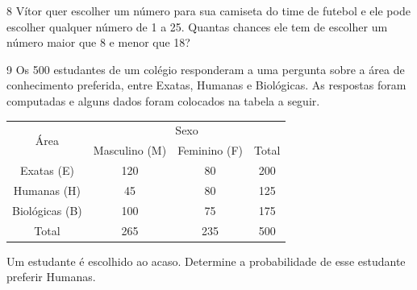 
\num{8} Vítor quer escolher um número para sua camiseta do time de futebol e ele
pode escolher qualquer número de 1 a 25. Quantas chances ele tem de
escolher um número maior que 8 e menor que 18?

\begin{mdframed}[linewidth=2pt,linecolor=salmao,roundcorner=2pt]


\end{mdframed}

\num{9} Os 500 estudantes de um colégio responderam a uma pergunta sobre a
área de conhecimento preferida, entre Exatas, Humanas e
Biológicas. As respostas foram computadas e alguns dados foram colocados
na tabela a seguir.

\begin{center}
\begin{tabular}{c|ccc}
\hline
\multirow{2}{*}{Área} & \multicolumn{3}{c}{Sexo} \\ \cline{2-4} 
 & \multicolumn{1}{c|}{Masculino (M)} & \multicolumn{1}{c|}{Feminino (F)} & Total \\ \hline
Exatas (E) & \multicolumn{1}{c|}{120} & \multicolumn{1}{c|}{80} & 200 \\ \hline
Humanas (H) & \multicolumn{1}{c|}{45} & \multicolumn{1}{c|}{80} & 125 \\ \hline
Biológicas (B) & \multicolumn{1}{c|}{100} & \multicolumn{1}{c|}{75} & 175 \\ \hline
Total & \multicolumn{1}{c|}{265} & \multicolumn{1}{c|}{235} & 500 \\ \hline
\end{tabular}
\end{center}

Um estudante é escolhido ao acaso. Determine a probabilidade de esse
estudante preferir Humanas.

\begin{mdframed}[linewidth=2pt,linecolor=salmao,roundcorner=2pt]


\end{mdframed}

